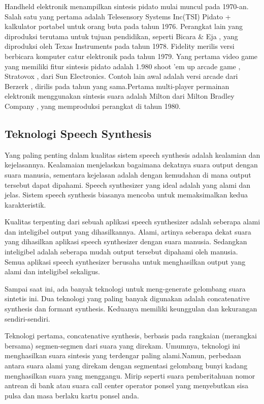 Handheld elektronik menampilkan sintesis pidato mulai muncul pada 1970-an. Salah satu yang pertama adalah Telesensory Systems Inc(TSI) Pidato + kalkulator portabel untuk orang buta pada tahun 1976. Perangkat lain yang diproduksi terutama untuk tujuan pendidikan, seperti Bicara \& Eja , yang diproduksi oleh Texas Instruments pada tahun 1978. Fidelity merilis versi berbicara komputer catur elektronik pada tahun 1979. Yang pertama video game yang memiliki fitur sintesis pidato adalah 1.980 shoot ’em up arcade game , Stratovox , dari Sun Electronics. Contoh lain awal adalah versi arcade dari Berzerk , dirilis pada tahun yang sama.Pertama multi-player permainan elektronik menggunakan sintesis suara adalah Milton dari Milton Bradley Company , yang memproduksi perangkat di tahun 1980.

\subsection{Teknologi Speech Synthesis}
Yang paling penting dalam kualitas sistem speech synthesis adalah kealamian dan kejelasannya. Kealamaian menjelaskan bagaimana dekatnya suara output dengan suara manusia, sementara kejelasan adalah dengan kemudahan di mana output tersebut dapat dipahami. Speech synthesizer yang ideal adalah yang alami dan jelas. Sistem speech synthesis biasanya mencoba untuk memaksimalkan kedua karakteristik.

Kualitas terpenting dari sebuah aplikasi speech synthesizer adalah seberapa alami dan inteligibel output yang dihasilkannya. Alami, artinya seberapa dekat suara yang dihasilkan aplikasi speech synthesizer dengan suara manusia. Sedangkan inteligibel adalah seberapa mudah output tersebut dipahami oleh manusia. Semua aplikasi speech synthesizer berusaha untuk menghasilkan output yang alami dan inteligibel sekaligus.

Sampai saat ini, ada banyak teknologi untuk meng-generate gelombang suara sintetis ini. Dua teknologi yang paling banyak digunakan adalah concatenative synthesis\cite{Hunt1996UnitSI} dan formant synthesis. Keduanya memiliki keunggulan dan kekurangan sendiri-sendiri.

Teknologi pertama, concatenative synthesis\cite{Hunt1996UnitSI}, berbasis pada rangkaian (merangkai bersama) segmen-segmen dari suara yang direkam. Umumnya, teknologi ini menghasilkan suara sintesis yang terdengar paling alami.Namun, perbedaan antara suara alami yang direkam dengan segmentasi gelombang bunyi kadang menghasilkan suara yang menggangu. Mirip seperti suara pemberitahuan nomor antrean di bank atau suara call center operator ponsel yang menyebutkan sisa pulsa dan masa berlaku kartu ponsel anda.

